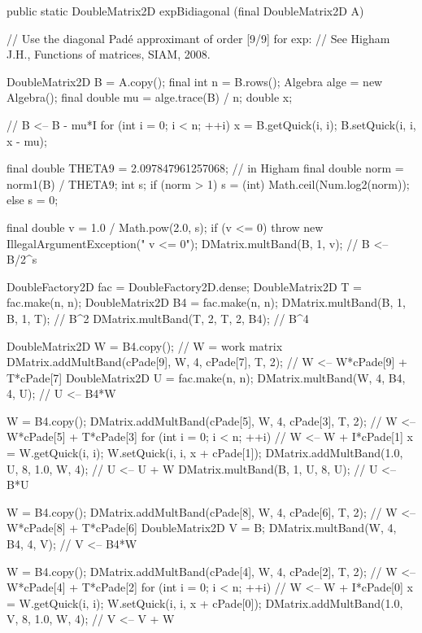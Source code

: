 \begin{code}

   public static DoubleMatrix2D expBidiagonal (final DoubleMatrix2D A) \begin{hide} {
      // Use the diagonal Padé approximant of order [9/9] for exp:
      // See Higham J.H., Functions of matrices, SIAM, 2008.

      DoubleMatrix2D B = A.copy();
      final int n = B.rows();
      Algebra alge = new Algebra();
      final double mu = alge.trace(B) / n;
      double x;

      // B <-- B - mu*I
      for (int i = 0; i < n; ++i) {
         x = B.getQuick(i, i);
         B.setQuick(i, i, x - mu);
      }

      final double THETA9 = 2.097847961257068; // in Higham
      final double norm = norm1(B) / THETA9;
      int s;
      if (norm > 1)
         s = (int) Math.ceil(Num.log2(norm));
      else
         s = 0;

      final double v = 1.0 / Math.pow(2.0, s);
      if (v <= 0)
         throw new IllegalArgumentException("   v <= 0");
      DMatrix.multBand(B, 1, v); // B <-- B/2^s

      DoubleFactory2D fac = DoubleFactory2D.dense;
      DoubleMatrix2D T = fac.make(n, n);
      DoubleMatrix2D B4 = fac.make(n, n);
      DMatrix.multBand(B, 1, B, 1, T); // B^2
      DMatrix.multBand(T, 2, T, 2, B4); // B^4

      DoubleMatrix2D W = B4.copy(); // W = work matrix
      DMatrix.addMultBand(cPade[9], W, 4, cPade[7], T, 2); // W <-- W*cPade[9] + T*cPade[7]
      DoubleMatrix2D U = fac.make(n, n);
      DMatrix.multBand(W, 4, B4, 4, U); // U <-- B4*W

      W = B4.copy();
      DMatrix.addMultBand(cPade[5], W, 4, cPade[3], T, 2); // W <-- W*cPade[5] + T*cPade[3]
      for (int i = 0; i < n; ++i) {   // W <-- W + I*cPade[1]
         x = W.getQuick(i, i);
         W.setQuick(i, i, x + cPade[1]);
      }
      DMatrix.addMultBand(1.0, U, 8, 1.0, W, 4); // U <-- U + W
      DMatrix.multBand(B, 1, U, 8, U); // U <-- B*U

      W = B4.copy();
      DMatrix.addMultBand(cPade[8], W, 4, cPade[6], T, 2); // W <-- W*cPade[8] + T*cPade[6]
      DoubleMatrix2D V = B;
      DMatrix.multBand(W, 4, B4, 4, V); // V <-- B4*W

      W = B4.copy();
      DMatrix.addMultBand(cPade[4], W, 4, cPade[2], T, 2); // W <-- W*cPade[4] + T*cPade[2]
      for (int i = 0; i < n; ++i) {   // W <-- W + I*cPade[0]
         x = W.getQuick(i, i);
         W.setQuick(i, i, x + cPade[0]);
      }
      DMatrix.addMultBand(1.0, V, 8, 1.0, W, 4); // V <-- V + W

}
\end{hide}
\end{code}
